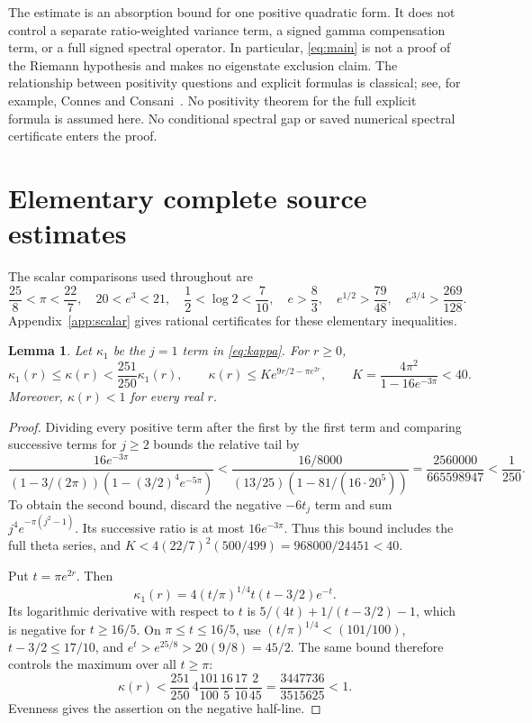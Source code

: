 \documentclass[11pt]{article}
\newtheorem{lemma}[theorem]{Lemma}
\theoremstyle{remark}\newtheorem{remark}[theorem]{Remark}
\numberwithin{equation}{section}
\begin{document}
The estimate is an absorption bound for one positive quadratic form. It does not control a separate ratio-weighted variance term, a signed gamma compensation term, or a full signed spectral operator. In particular, \eqref{eq:main} is not a proof of the Riemann hypothesis and makes no eigenstate exclusion claim. The relationship between positivity questions and explicit formulas is classical; see, for example, Connes and Consani~\cite{ConnesConsani2021}. No positivity theorem for the full explicit formula is assumed here. No conditional spectral gap or saved numerical spectral certificate enters the proof.

\section{Elementary complete source estimates}\label{sec:source}
The scalar comparisons used throughout are
\begin{equation}\label{eq:elementary}
 \frac{25}{8}<\pi<\frac{22}{7},\quad
 20<e^3<21,\quad \frac12<\log2<\frac7{10},\quad
 e>\frac83,\quad e^{1/2}>\frac{79}{48},\quad
 e^{3/4}>\frac{269}{128}.
\end{equation}
Appendix~\ref{app:scalar} gives rational certificates for these elementary inequalities.

\begin{lemma}\label{lem:envelope}
Let $\kappa_1$ be the $j=1$ term in \eqref{eq:kappa}. For $r\ge0$,
\begin{equation}\label{eq:sourcebounds}
 \kappa_1(r)\le\kappa(r)<\frac{251}{250}\kappa_1(r),\qquad
 \kappa(r)\le K e^{9r/2-\pi e^{2r}},\qquad
 K=\frac{4\pi^2}{1-16e^{-3\pi}}<40.
\end{equation}
Moreover, $\kappa(r)<1$ for every real $r$.
\end{lemma}
\begin{proof}
Dividing every positive term after the first by the first term and comparing successive terms for $j\ge2$ bounds the relative tail by
\[
 \frac{16e^{-3\pi}}
 {(1-3/(2\pi))(1-(3/2)^4e^{-5\pi})}
 <\frac{16/8000}{(13/25)(1-81/(16\cdot20^5))}
 =\frac{2560000}{665598947}<\frac1{250}.
\]
To obtain the second bound, discard the negative $-6t_j$ term and sum $j^4e^{-\pi(j^2-1)}$. Its successive ratio is at most $16e^{-3\pi}$. Thus this bound includes the full theta series, and
$K<4(22/7)^2(500/499)=968000/24451<40$.

Put $t=\pi e^{2r}$. Then
\[
 \kappa_1(r)=4(t/\pi)^{1/4}t(t-3/2)e^{-t}.
\]
Its logarithmic derivative with respect to $t$ is
$5/(4t)+1/(t-3/2)-1$, which is negative for $t\ge16/5$.
On $\pi\le t\le16/5$, use
$(t/\pi)^{1/4}<(101/100)$, $t-3/2\le17/10$, and
$e^t>e^{25/8}>20(9/8)=45/2$. The same bound therefore controls the maximum over all $t\ge\pi$:
\[
 \kappa(r)<\frac{251}{250}\,4\frac{101}{100}\frac{16}{5}\frac{17}{10}\frac2{45}
 =\frac{3447736}{3515625}<1.
\]
Evenness gives the assertion on the negative half-line.
\end{proof}
\end{document}

